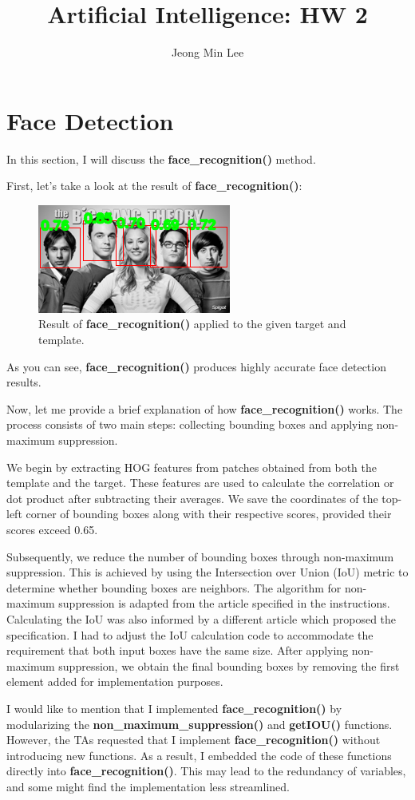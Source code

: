 \documentclass[10pt]{article}
\title{\textbf{Artificial Intelligence: HW 2}}
\author{Jeong Min Lee}
\begin{document}
\maketitle

\section{Face Detection}
In this section, I will discuss the \textbf{face\_recognition()} method.

First, let's take a look at the result of \textbf{face\_recognition()}:
\begin{figure}[!h]
    \begin{center}
        \includegraphics[scale=1.5]{./figures/result_face_detection.png}
    \end{center}
    \caption{Result of \textbf{face\_recognition()} applied to the given target and template.}
\end{figure}

As you can see, \textbf{face\_recognition()} produces highly accurate face detection results. 

Now, let me provide a brief explanation of how \textbf{face\_recognition()} works. The process consists of two main steps: collecting bounding boxes and applying non-maximum suppression. 

We begin by extracting HOG features from patches obtained from both the template and the target. These features are used to calculate the correlation or dot product after subtracting their averages. We save the coordinates of the top-left corner of bounding boxes along with their respective scores, provided their scores exceed 0.65.

Subsequently, we reduce the number of bounding boxes through non-maximum suppression. This is achieved by using the Intersection over Union (IoU) metric to determine whether bounding boxes are neighbors. The algorithm for non-maximum suppression is adapted from the article specified in the instructions. Calculating the IoU was also informed by a different article which proposed the specification. I had to adjust the IoU calculation code to accommodate the requirement that both input boxes have the same size. After applying non-maximum suppression, we obtain the final bounding boxes by removing the first element added for implementation purposes.

I would like to mention that I implemented \textbf{face\_recognition()} by modularizing the \textbf{non\_maximum\_suppression()} and \textbf{getIOU()} functions. However, the TAs requested that I implement \textbf{face\_recognition()} without introducing new functions. As a result, I embedded the code of these functions directly into \textbf{face\_recognition()}. This may lead to the redundancy of variables, and some might find the implementation less streamlined.
\end{document}
